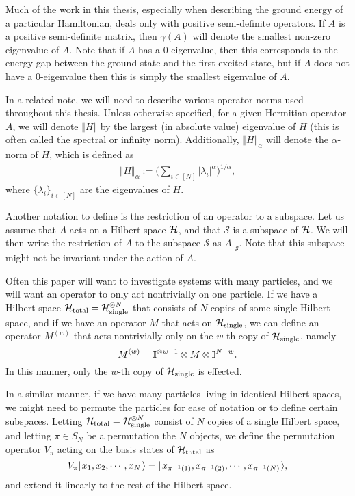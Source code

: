 \documentclass[../thesis-main/thesis-main]{subfiles}
\begin{document}
Much of the work in this thesis, especially when describing the ground energy of a particular Hamiltonian, deals only with positive semi-definite operators. If $A$ is a positive semi-definite matrix, then $\gamma(A)$ will denote the smallest non-zero eigenvalue of $A$.   Note that if $A$ has a 0-eigenvalue, then this corresponds to the energy gap between the ground state and the first excited state, but if $A$ does not have a 0-eigenvalue then this is simply the smallest eigenvalue of $A$.

In a related note, we will need to describe various operator norms used throughout this thesis.  Unless otherwise specified, for a given Hermitian operator $A$, we will denote $\Vert H \Vert$ by the largest (in absolute value) eigenvalue of $H$ (this is often called the spectral or infinity norm).  Additionally, $\Vert H\Vert_{\alpha}$ will denote the $\alpha$-norm of $H$, which is defined as
\begin{align}
  \Vert H \Vert_\alpha := \Big( \sum_{i\in [N]} |\lambda_i|^\alpha \Big)^{1/\alpha},
\end{align}
where $\{\lambda_i\}_{i\in[N]}$ are the eigenvalues of $H$.

Another notation to define is the restriction of an operator to a subspace.  Let us assume that $A$ acts on a Hilbert space $\mathcal{H}$, and that $\mathcal{S}$ is a subspace of $\mathcal{H}$.  We will then write the restriction of $A$ to the subspace $\mathcal{S}$ as $A\big|_\mathcal{S}$.  Note that this subspace might not be invariant under the action of $A$.


Often this paper will want to investigate systems with many particles, and we will want an operator to only act nontrivially on one particle.  If we have a Hilbert space $\mathcal{H}_{\text{total}} = \mathcal{H}_{\text{single}}^{\otimes N}$ that consists of $N$ copies of some single Hilbert space, and if we have an operator $M$ that acts on $\mathcal{H}_{\text{single}}$, we can define an operator $M^{(w)}$ that acts nontrivially only on the $w$-th copy of $\mathcal{H}_{\text{single}}$, namely
\begin{equation}
  M^{(w)} = \mathbb{I}^{\otimes w-1} \otimes M \otimes \mathbb{I}^{N- w}.
\end{equation}
In this manner, only the $w$-th copy of $\mathcal{H}_{\text{single}}$ is effected.

In a similar manner, if we have many particles living in identical Hilbert spaces, we might need to permute the particles for ease of notation or to define certain subspaces.  Letting $\mathcal{H}_{\text{total}} = \mathcal{H}_{\text{single}}^{\otimes N}$ consist of $N$ copies of a single Hilbert space, and letting $\pi \in S_N$ be a permutation the $N$ objects, we define the permutation operator $V_\pi$ acting on the basis states of $\mathcal{H}_{\text{total}}$ as
\begin{equation}
  V_\pi |\mspace{2mu} x_1,x_2,\cdots,x_N \mspace{2mu} \rangle = |\mspace{2mu} x_{\pi^{-1}(1)},x_{\pi^{-1}(2)},\cdots,x_{\pi^{-1}(N)} \mspace{2mu} \rangle,
\end{equation}
and extend it linearly to the rest of the Hilbert space.
\end{document}
